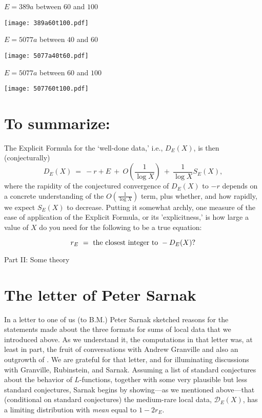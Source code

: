\documentclass[11pt]{article}
\theoremstyle{plain}
\theoremstyle{definition}
\numberwithin{equation}{section}
\numberwithin{figure}{section}
\numberwithin{table}{section}
\begin{document}
   \centerline{ $E = 389a$  between $60$ and $100$}
   \vskip10pt
 \hskip100pt \texttt{[image: 389a60t100.pdf]}
\newpage
  \centerline{ $E = 5077a$  between $40$ and $60$}
   \vskip10pt
 \hskip100pt \texttt{[image: 5077a40t60.pdf]}

   \centerline{ $E = 5077a$  between $60$ and $100$}
   \vskip10pt
 \hskip100pt \texttt{[image: 507760t100.pdf]}


  \section{ To summarize:}  The  Explicit Formula for the `well-done data,' i.e., ${D}_E(X)$,  is then (conjecturally)
   $${D}_E(X)\ = \ -r+E \ +\ O( {\frac{1}{\log X}})\  +\  {\frac{1}{\log X}}S_E(X),$$
   where the rapidity of the conjectured convergence of ${D}_E(X)$ to $-r$ depends on a concrete understanding of the $O( {\frac{1}{\log X}})$ term, plus whether, and how rapidly, we expect  $S_E(X)$ to decrease. Putting it somewhat archly, one measure of the ease of application of  the Explicit Formula, or its 'explicitness,' is how large a value of $X$ do  you need for the following to be a true equation:

   $$r_E \ = \ {\rm the\ closest\ integer\ to \ }- {D}_E(X)?$$


   \vskip40pt
 \centerline{ \Large{ Part II: Some  theory}}
  \vskip30pt


    \section{The letter of Peter Sarnak}  In a letter  \cite{S}  to one of us (to B.M.) Peter Sarnak sketched reasons for the statements made about the three formats for sums of local data that we  introduced above. As we  understand it, the computations in that letter was, at least in part, the fruit of conversations with Andrew Granville and also an outgrowth of \cite{R-S}. We are grateful for that letter, and for  illuminating discussions with    Granville, Rubinstein, and Sarnak.  Assuming a list of standard conjectures about the behavior of $L$-functions, together with some very plausible but less standard conjectures, Sarnak begins by showing---as we mentioned above---that (conditional on standard conjectures) the medium-rare local data,  ${\mathcal D}_E(X)$, has a limiting distribution with {\it mean} equal to $1- 2r_E$.
\end{document}
